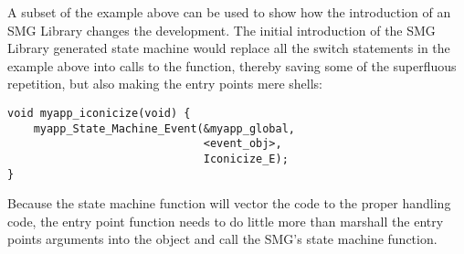 A subset of the example above can be used to show how the introduction
of an SMG Library changes the development.  The initial introduction
of the SMG Library generated state machine would replace all the
switch statements in the example above into calls to the
 function, thereby saving some of the
superfluous repetition, but also making the entry points mere shells:

\begin{verbatim}
void myapp_iconicize(void) {
    myapp_State_Machine_Event(&myapp_global,
                              <event_obj>,
                              Iconicize_E);
}
\end{verbatim}

Because the state machine function will vector the code to the proper
handling code, the entry point function needs to do little more than marshall the entry points arguments into the \SMEVT object and call the
SMG's state machine function.  


